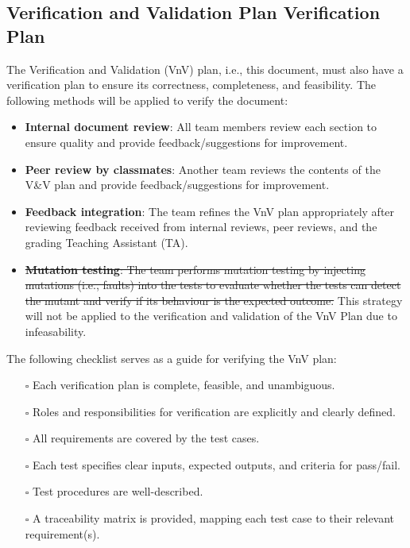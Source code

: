 \documentclass[12pt, titlepage]{article}
\begin{document}
\subsection{Verification and Validation Plan Verification Plan}
The Verification and Validation (VnV) plan, i.e., this document, must also have
a verification plan to ensure its correctness, completeness, and feasibility.
The following methods will be applied to verify the document:
\begin{itemize}
  \item \textbf{Internal document review}: All team members review each section
  to ensure quality and provide feedback/suggestions for improvement.
  \item \textbf{Peer review by classmates}: Another team reviews the contents of
  the V\&V plan and provide feedback/suggestions for improvement.
  \item \textbf{Feedback integration}: The team refines the VnV plan
  appropriately after reviewing feedback received from internal reviews, peer
  reviews, and the grading Teaching Assistant (TA).
  \item \st{\textbf{Mutation testing}: The team performs mutation testing by
  injecting mutations (i.e., faults) into the tests to evaluate whether the
  tests can detect the mutant and verify if its behaviour is the expected
  outcome.} This strategy will not be applied to the verification and
  validation of the VnV Plan due to infeasability.
\end{itemize}
The following checklist serves as a guide for verifying the VnV plan:
\begin{itemize}
  \item[$\square$] Each verification plan is complete, feasible, and
  unambiguous.
  \item[$\square$] Roles and responsibilities for verification are explicitly
  and clearly defined.
  \item[$\square$] All requirements are covered by the test cases.
  \item[$\square$] Each test specifies clear inputs, expected outputs, and
  criteria for pass/fail.
  \item[$\square$] Test procedures are well-described.
  \item[$\square$] A traceability matrix is provided, mapping each test case to
  their relevant requirement(s).
\end{itemize}
\end{document}
